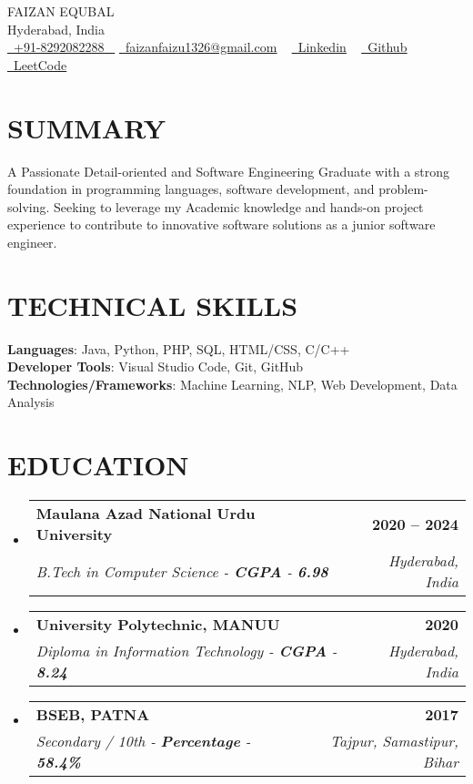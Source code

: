 \documentclass[letterpaper,11pt]{article}
\makeatletter
\newcommand{\resumeSubheading}[4]{
  \vspace{-2pt}\item
    \begin{tabular*}{1.0\textwidth}[t]{l@{\extracolsep{\fill}}r}
      \textbf{\large#1} & \textbf{\small #2} \\
      \textit{\large#3} & \textit{\small #4} \\
      
    \end{tabular*}\vspace{-7pt}
}
\newcommand{\resumeSubHeadingListStart}{\begin{itemize}[leftmargin=0.0in, label={}]}
\newcommand{\resumeSubHeadingListEnd}{\end{itemize}}
\makeatother
\begin{document}



\begin{center}
    {\Huge \scshape FAIZAN EQUBAL} \\ \vspace{1pt}
    Hyderabad, India \\ \vspace{1pt}
    \small \href{tel:+918292082288}{ \raisebox{-0.1\height}\faPhone\ \underline{+91-8292082288} ~} \href{mailto:faizanfaizu1326@gmail.com}{\raisebox{-0.2\height}\faEnvelope\  \underline{faizanfaizu1326@gmail.com}} ~ 
    \href{https://www.linkedin.com/in/faizan-equbal-5171322l/}{\raisebox{-0.2\height}\faLinkedinSquare\ \underline{Linkedin}}  ~
    \href{https://github.com/}{\raisebox{-0.2\height}\faGithub\ \underline{Github}} ~
    \href{https://leetcode.com/}{\raisebox{-0.2\height}\faCode\ \underline{LeetCode}} ~
    \vspace{-8pt}
\end{center}


\section{SUMMARY}
    A Passionate Detail-oriented and Software Engineering Graduate with a strong foundation in programming languages, software development, and problem-solving. Seeking to leverage my Academic knowledge and hands-on project experience to contribute to innovative software solutions as a junior software engineer.




\section{TECHNICAL SKILLS}
    \textbf{Languages}: Java, Python, PHP, SQL, HTML/CSS, C/C++ \\
    \textbf{Developer Tools}: Visual Studio Code, Git, GitHub \\
    \textbf{Technologies/Frameworks}: Machine Learning, NLP, Web Development, Data Analysis






\section{EDUCATION}
  \resumeSubHeadingListStart
    \resumeSubheading
      {Maulana Azad National Urdu University}{2020 – 2024}
      {B.Tech in Computer Science - \textbf{CGPA} - \textbf{6.98}}{Hyderabad, India}
    \resumeSubheading
      {University Polytechnic, MANUU}{2020}
      {Diploma in Information Technology - \textbf{CGPA} - \textbf{8.24}}{Hyderabad, India}
    \resumeSubheading
      {BSEB, PATNA}{2017}
      {Secondary / 10th - \textbf{Percentage} - \textbf{58.4\%}}{Tajpur, Samastipur, Bihar}
  \resumeSubHeadingListEnd{}
\end{document}
